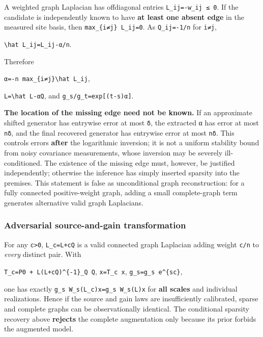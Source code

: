 \documentclass[
  10pt,
  a4paper,
]{article}
\begin{document}
A weighted graph Laplacian has offdiagonal entries \texttt{L\_ij=-w\_ij\ ≤\ 0}. If the candidate is independently known to have \textbf{at least one absent edge} in the measured site basis, then \texttt{max\_\{i≠j\}\ L\_ij=0}. As \texttt{Q\_ij=-1/n} for \texttt{i≠j},

\texttt{\textbackslash{}hat\ L\_ij=L\_ij-α/n}.

Therefore

\texttt{α=-n\ max\_\{i≠j\}\textbackslash{}hat\ L\_ij},

\texttt{L=\textbackslash{}hat\ L-αQ}, and \texttt{g\_s/g\_t=exp{[}(t-s)α{]}}.

\textbf{The location of the missing edge need not be known.} If an approximate shifted generator has entrywise error at most \texttt{δ}, the extracted α has error at most \texttt{nδ}, and the final recovered generator has entrywise error at most \texttt{nδ}. This controls errors \textbf{after} the logarithmic inversion; it is not a uniform stability bound from noisy covariance measurements, whose inversion may be severely ill-conditioned. The existence of the missing edge must, however, be justified independently; otherwise the inference has simply inserted sparsity into the premises. This statement is false as unconditional graph reconstruction: for a fully connected positive-weight graph, adding a small complete-graph term generates alternative valid graph Laplacians.

\subsubsection{Adversarial source-and-gain transformation}\label{adversarial-source-and-gain-transformation}

For any \texttt{c\textgreater{}0}, \texttt{L\_c=L+cQ} is a valid connected graph Laplacian adding weight \texttt{c/n} to \emph{every} distinct pair. With

\texttt{T\_c=P0\ +\ L(L+cQ)\^{}\{-1\}\_Q\ Q}, \texttt{x\textquotesingle{}=T\_c\ x}, \texttt{g\textquotesingle{}\_s=g\_s\ e\^{}\{sc\}},

one has exactly \texttt{g\textquotesingle{}\_s\ W\_s(L\_c)x\textquotesingle{}=g\_s\ W\_s(L)x} for \textbf{all scales} and individual realizations. Hence if the source and gain laws are insufficiently calibrated, sparse and complete graphs can be observationally identical. The conditional sparsity recovery above \textbf{rejects} the complete augmentation only because its prior forbids the augmented model.
\end{document}
